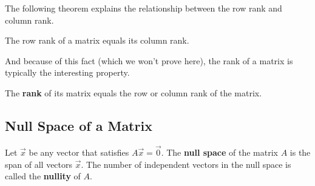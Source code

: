 The following theorem explains the relationship between the row rank and column rank.

\begin{theorem}
The row rank of a matrix equals its column rank.
\end{theorem}

And because of this fact (which we won't prove here), the rank of a matrix is typically the interesting property.

\begin{definition}
The \textbf{rank} of its matrix equals the row or column rank of the matrix.
\end{definition}

\subsection{Null Space of a Matrix}

\begin{definition}
Let $\vec{x}$ be any vector that satisfies $A \vec{x}=\vec{0}$.  The \textbf{null space} of the matrix $A$ is the span of all vectors $\vec{x}$.  The number of independent vectors in the null space is called the \textbf{nullity} of $A$.
\end{definition}

